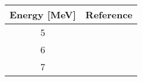 \begin{tabular}{c c} 
    \toprule 
    \bf{Energy [MeV]} & \bf{Reference} \\
    \midrule
    5 & \cite{Korzh80}\\
    6 & \cite{Korzh80}\\
    7 & \cite{Korzh80}\\
    \bottomrule
\end{tabular}

